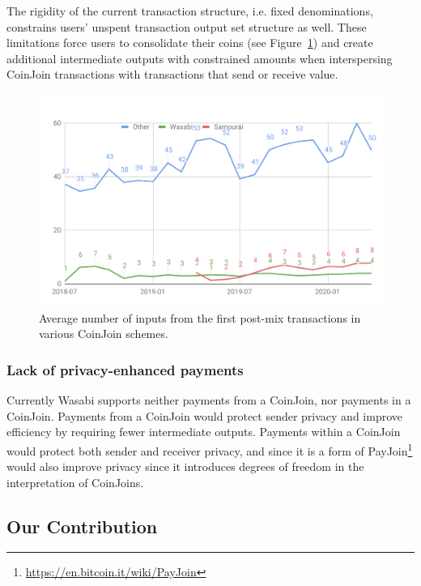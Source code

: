 \documentclass{article}
\begin{document}
The rigidity of the current transaction structure, i.e. fixed denominations, constrains users' unspent transaction output set structure as well. These limitations force users to consolidate their coins (see Figure~\ref{fig:postmixmerging}) and create additional intermediate outputs with constrained amounts when interspersing CoinJoin transactions with transactions that send or receive value.

\begin{figure}[h!]
    \centering
    \includegraphics[scale=0.4]{Figures/postMixInputMerging.pdf}
    \caption[]{Average number of inputs from the first post-mix transactions in various CoinJoin schemes.\footnotemark}
    \label{fig:postmixmerging}
\end{figure}


\subsubsection{Lack of privacy-enhanced payments} Currently Wasabi supports neither payments from a CoinJoin, nor payments in a CoinJoin. Payments from a CoinJoin would protect sender privacy and improve efficiency by requiring fewer intermediate outputs. Payments within a CoinJoin would protect both sender and receiver privacy, and since it is a form of PayJoin\footnote{\url{https://en.bitcoin.it/wiki/PayJoin}} would also improve privacy since it introduces degrees of freedom in the interpretation of CoinJoins.

\subsection{Our Contribution}
\end{document}
